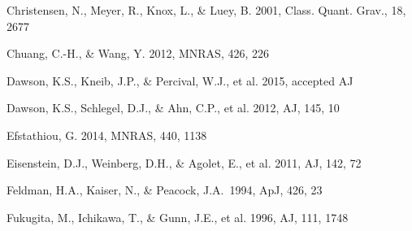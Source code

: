 \documentclass[useAMS,usenatbib]{mnras}
\begin{document}
\begin{thebibliography}{}




Christensen, N., Meyer, R., Knox, L., \& Luey, B. 2001, Class. Quant. Grav., 18, 2677


Chuang, C.-H., \& Wang, Y. 2012, MNRAS, 426, 226  



Dawson, K.S., Kneib, J.P., \& Percival, W.J., et al. 2015, accepted AJ

Dawson, K.S., Schlegel, D.J., \& Ahn, C.P., et al. 2012, AJ, 145, 10

Efstathiou, G. 2014, MNRAS, 440, 1138

Eisenstein, D.J.,  Weinberg, D.H., \& Agolet, E., et al. 2011, AJ, 142, 72

Feldman, H.A., Kaiser, N., \& Peacock, J.A.\ 1994, ApJ, 426, 23 

Fukugita, M., Ichikawa, T., \& Gunn, J.E., et al. 1996, AJ, 111, 1748






\end{thebibliography}
\end{document}
